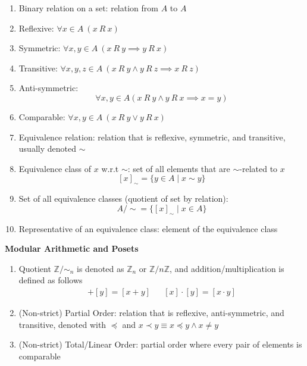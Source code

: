 \documentclass[landscape, a4paper]{article}
\newcommand{\Z}{\mathbb{Z}}
\newcommand{\Or}{\vee}
\renewcommand{\and}{\wedge}
\newcommand{\heading}[1]{
    \noindent\textbf{#1}
}
\newenvironment{wenumerate}{\begin{enumerate}[wide, labelindent=2pt]}{\end{enumerate}}
\begin{document}
\begin{multicols*}{4}
\begin{wenumerate}
\begin{enumerate}
        \end{enumerate}
        \begin{align*}
            R      & = \{(x,y)\in A\times B \mid x\ R\ y\}      \\
            R^{-1} & = \{(y,x)\in B\times A \mid y\ R^{-1}\ x\}
        \end{align*}
        \item Binary relation on a set: relation from $A$ to $A$
        \item Reflexive: $\forall x\in A\ (x\ R\ x)$
        \item Symmetric: $\forall x,y\in A\ (x\ R\ y\implies y\ R\ x)$
        \item Transitive: $\forall x,y,z\in A\ (x\ R\ y \and y\ R\ z \implies x\ R\ z)$
        \item Anti-symmetric:
        \[
            \forall x,y\in A \left(x\ R\ y\and y\ R\ x\implies x=y\right)
        \]
        \item Comparable: $\forall x,y\in A\ (x\ R\ y \Or y\ R\ x)$
        \item Equivalence relation: relation that is reflexive, symmetric, and transitive, usually denoted ${\sim}$
        \item Equivalence class of $x$ w.r.t ${\sim}$: set of all elements that are ${\sim}$-related to $x$
        \[
            [x]_{\sim}=\{y\in A\mid x \sim y\}
        \]
        \item Set of all equivalence classes (quotient of set by relation):
        \[
            A/{\sim} =\{[x]_\sim\mid x\in A\}
        \]
        \item Representative of an equivalence class: element of the equivalence class
    \end{wenumerate}
    \heading{Modular Arithmetic and Posets}
    \begin{wenumerate}
        \item Quotient $\Z/{\sim}_n$ is denoted as $\Z_n$ or $\Z/n\Z$, and addition/multiplication is defined as follows
        \begin{align*}
            [x]+[y]=[x+y] &  & [x]\cdot[y]=[x\cdot y]
        \end{align*}
        \item (Non-strict) Partial Order: relation that is reflexive, anti-symmetric, and transitive, denoted with $\preccurlyeq$ and $x\prec y\equiv x\preccurlyeq y \and x\neq y$
        \item (Non-strict) Total/Linear Order: partial order where every pair of elements is comparable

\end{wenumerate}
\end{multicols*}
\end{document}
